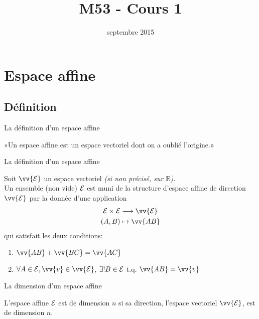 \documentclass[
bigger]{m53beamer}
\title{M53 - Cours 1}
\date{septembre 2015}
\begin{document}
\begin{frame}
  \titlepage
\end{frame}

\section{Espace affine}
\subsection{Définition}
\begin{frame}{La définition d'un espace affine}
  \begin{definition}[heuristique]
    «Un espace affine est un espace vectoriel dont on a oublié l'origine.»
  \end{definition}
\end{frame}
\begin{frame}{La définition d'un espace affine}
  \begin{definition}
    Soit $\vv{\ens{E}}$ un espace vectoriel \emph{(si non précisé, sur $\mathbb{R}$)}.\pause\\
    Un ensemble (non vide) $\mathcal{E}$ est muni de la structure d'\alert{espace affine de direction $\vv{\ens{E}}$}
    par la donnée d'une application
    \begin{gather*}
      \ens{E} \times \ens{E} \longrightarrow \vv{\ens{E}}\\
      (A,B) \mapsto \vv{AB}
    \end{gather*}\pause
    qui satisfait les deux conditions:
    \begin{enumerate}[<+(1)->]
      \item $\vv{AB}+\vv{BC}=\vv{AC}$ 
      \item $\forall A \in \ens{E}, \vv{v} \in \vv{\ens{E}}$\pause , $\exists ! B \in \mathcal{E}$ t.q. $\vv{AB}=\vv{v}$
    \end{enumerate}
  \end{definition}
\end{frame}
\begin{frame}{La dimension d'un espace affine}
  \begin{definition}
    L'espace affine $\mathcal{E}$ est de dimension $n$ si sa direction, l'espace vectoriel $\vv{\ens{E}}$, est de dimension $n$.
  \end{definition}
\end{frame}
\end{document}
